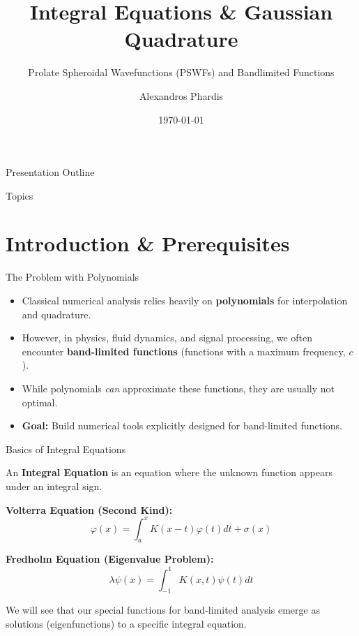 \documentclass[10pt]{beamer}
\title{Integral Equations \& Gaussian Quadrature}
\subtitle{Prolate Spheroidal Wavefunctions (PSWFs) and Bandlimited Functions}
\author{Alexandros Phardis}
\date{\today}
\begin{document}
\begin{frame}
    \maketitle
\end{frame}

\begin{frame}{Presentation Outline}
    \begin{block}{Topics}
        \tableofcontents[hideallsubsections]
    \end{block}
\end{frame}

\section{Introduction \& Prerequisites}

\begin{frame}{The Problem with Polynomials}
    \begin{itemize}
        \item Classical numerical analysis relies heavily on \textbf{polynomials} for interpolation and quadrature.
        \item However, in physics, fluid dynamics, and signal processing, we often encounter \textbf{band-limited functions} (functions with a maximum frequency, $c$).
        \item While polynomials \textit{can} approximate these functions, they are usually not optimal.
        \item \textbf{Goal:} Build numerical tools explicitly designed for band-limited functions.
    \end{itemize}
\end{frame}

\begin{frame}{Basics of Integral Equations}
    \begin{definition}
An \textbf{Integral Equation} is an equation where the unknown function appears under an integral sign.
    \end{definition}
        \begin{definition}
\textbf{Volterra Equation (Second Kind):} 
\[\varphi(x) = \int_{a}^{x} K(x-t)\varphi(t)dt + \sigma(x)\]
    \end{definition}
    \begin{definition}
\textbf{Fredholm Equation (Eigenvalue Problem):}
        \[ \lambda \psi(x) = \int_{-1}^{1} K(x,t) \psi(t) dt \]
            \end{definition}
We will see that our special functions for band-limited analysis emerge as solutions (eigenfunctions) to a specific integral equation.
\end{frame}
\end{document}
